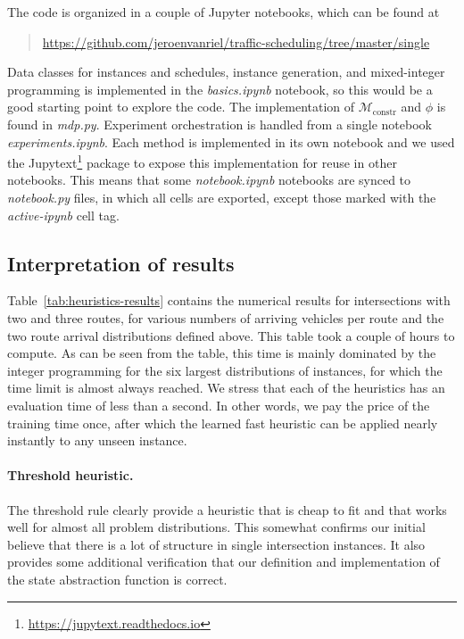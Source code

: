\documentclass{report}
\theoremstyle{definition}
\theoremstyle{plain}
\begin{document}
The code is organized in a couple of Jupyter notebooks, which can be found at
\begin{quote}
  \url{https://github.com/jeroenvanriel/traffic-scheduling/tree/master/single}
\end{quote}
%
Data classes for instances and schedules, instance generation, and mixed-integer
programming is implemented in the \emph{basics.ipynb} notebook, so this would be a
good starting point to explore the code.
%
The implementation of $\mathcal{M}_\textrm{constr}$ and $\phi$ is found in
\emph{mdp.py}.
%
Experiment orchestration is handled from a single notebook
\emph{experiments.ipynb}.
%
Each method is implemented in its own notebook and we used the
Jupytext\footnote{\url{https://jupytext.readthedocs.io}} package to expose this
implementation for reuse in other notebooks. This means that some
\emph{notebook.ipynb} notebooks are synced to \emph{notebook.py} files, in
which all cells are exported, except those marked with the \emph{active-ipynb}
cell tag.


\subsection{Interpretation of results}

Table~\ref{tab:heuristics-results} contains the numerical results for
intersections with two and three routes, for various numbers of arriving
vehicles per route and the two route arrival distributions defined above.
%
This table took a couple of hours to compute. As can be seen from the table,
this time is mainly dominated by the integer programming for the six largest
distributions of instances, for which the time limit is almost always reached.
%
We stress that each of the heuristics has an evaluation time of less than a
second. In other words, we pay the price of the training time once, after which
the learned fast heuristic can be applied nearly instantly to any unseen
instance.

\paragraph{Threshold heuristic.}
The threshold rule clearly provide a heuristic that is cheap to fit and that
works well for almost all problem distributions.
%
This somewhat confirms our initial believe that there is a lot of structure in
single intersection instances. It also provides some additional verification
that our definition and implementation of the state abstraction function is
correct.
\end{document}
